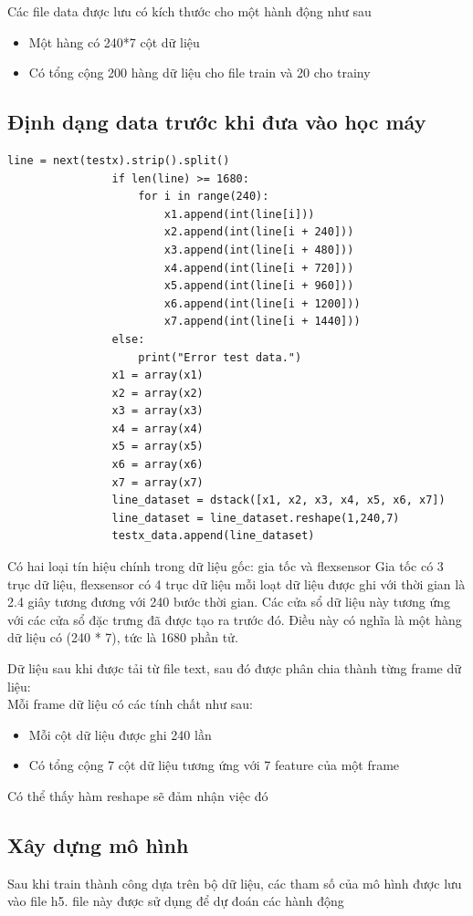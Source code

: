 Các file data được lưu có kích thước cho một hành động như sau 
\begin{itemize}
    \item Một hàng có 240*7 cột dữ liệu
    \item Có tổng cộng 200 hàng dữ liệu cho file train và 20 cho trainy 
\end{itemize}
\newpage
\subsection{Định dạng data trước khi đưa vào học máy}
\begin{lstlisting}
line = next(testx).strip().split()
                if len(line) >= 1680:
                    for i in range(240):
                        x1.append(int(line[i]))
                        x2.append(int(line[i + 240]))
                        x3.append(int(line[i + 480]))
                        x4.append(int(line[i + 720]))
                        x5.append(int(line[i + 960]))
                        x6.append(int(line[i + 1200]))
                        x7.append(int(line[i + 1440]))
                else:
                    print("Error test data.")
                x1 = array(x1)
                x2 = array(x2)
                x3 = array(x3)
                x4 = array(x4)
                x5 = array(x5)
                x6 = array(x6)
                x7 = array(x7)
                line_dataset = dstack([x1, x2, x3, x4, x5, x6, x7]) 
                line_dataset = line_dataset.reshape(1,240,7)
                testx_data.append(line_dataset)
\end{lstlisting}

Có hai loại tín hiệu chính trong dữ liệu gốc: gia tốc và flexsensor
Gia tốc có 3 trục dữ liệu, flexsensor có 4 trục dữ liệu
mỗi loạt dữ liệu được ghi với thời gian là 2.4 giây
tương đương với 240 bước thời gian. Các cửa sổ dữ liệu này tương ứng với các cửa sổ đặc trưng đã được tạo ra trước đó. Điều này có nghĩa là một hàng dữ liệu có (240 * 7), tức là 1680 phần tử.

Dữ liệu sau khi được tải từ file text, sau đó được phân chia thành từng frame dữ liệu:\\
Mỗi frame dữ liệu có các tính chất như sau:
\begin{itemize}
\item Mỗi cột dữ liệu được ghi 240 lần 
\item Có tổng cộng 7 cột dữ liệu tương ứng với 7 feature của một frame

\end{itemize}
Có thể thấy hàm reshape sẽ đảm nhận việc đó
\newpage
\subsection{Xây dựng mô hình}




Sau khi train thành công dựa trên bộ dữ liệu, các tham số của mô hình được lưu vào file h5. file này được sử dụng để dự đoán các hành động










